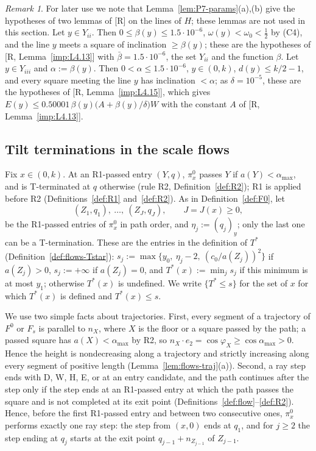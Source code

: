 \documentclass[11pt]{amsart}
\newcommand{\amax}{\alpha_{\max}}
\newcommand{\Fz}{F^{0}}
\newcommand{\Fs}{F_{s}}
\newcommand{\Tstar}{T^{*}}
\theoremstyle{definition}
\theoremstyle{remark}
\newtheorem{remark}[theorem]{Remark}
\numberwithin{equation}{section}
\begin{document}
\begin{remark}\label{rem:P7-R}
For later use we note that Lemma~\ref{lem:P7-params}(a),(b) give the hypotheses of two lemmas of [R] on the lines of $H$; these lemmas are not used in this section. Let $y\in Y_{ii}$. Then $0\le\beta(y)\le1.5\cdot10^{-6}$, $\omega(y)<\omega_0<\frac12$ by (C4), and the line $y$ meets a square of inclination $\ge\beta(y)$; these are the hypotheses of [R, Lemma~\ref{imp:L4.13}] with $\bar\beta=1.5\cdot10^{-6}$, the set $Y_{ii}$ and the function $\beta$. Let $y\in Y_{iii}$ and $\alpha:=\beta(y)$. Then $0<\alpha\le1.5\cdot10^{-6}$, $y\in(0,k)$, $d(y)\le k/2-1$, and every square meeting the line $y$ has inclination $<\alpha$; as $\delta=10^{-5}$, these are the hypotheses of [R, Lemma~\ref{imp:L4.15}], which gives $E(y)\le0.50001\,\beta(y)\big(A+\beta(y)/\delta\big)W$ with the constant $A$ of [R, Lemma~\ref{imp:L4.13}].
\end{remark}

\subsection{Tilt terminations in the scale flows}\label{ssec:P7-T}

Fix $x\in(0,k)$. At an R1-passed entry $(Y,q)$, $\pi^0_x$ passes $Y$ if $a(Y)<\amax$, and is T-terminated at $q$ otherwise (rule R2, Definition~\ref{def:R2}); R1 is applied before R2 (Definitions~\ref{def:R1} and~\ref{def:R2}). As in Definition~\ref{def:F0}, let
\[
(Z_1,q_1),\ \dots,\ (Z_J,q_J),\qquad J=J(x)\ge0,
\]
be the R1-passed entries of $\pi^0_x$ in path order, and $\eta_j:=(q_j)_y$; only the last one can be a T-termination. These are the entries in the definition of $\Tstar$ (Definition~\ref{def:flows-Tstar}): $s_j:=\max\{y_0,\ \eta_j-2,\ (c_0/a(Z_j))^2\}$ if $a(Z_j)>0$, $s_j:=+\infty$ if $a(Z_j)=0$, and $\Tstar(x):=\min_js_j$ if this minimum is at most $y_1$; otherwise $\Tstar(x)$ is undefined. We write $\{\Tstar\le s\}$ for the set of $x$ for which $\Tstar(x)$ is defined and $\Tstar(x)\le s$.

We use two simple facts about trajectories. First, every segment of a trajectory of $\Fz$ or $\Fs$ is parallel to $n_X$, where $X$ is the floor or a square passed by the path; a passed square has $a(X)<\amax$ by R2, so $n_X\cdot e_2=\cos\varphi_X\ge\cos\amax>0$. Hence the height is nondecreasing along a trajectory and strictly increasing along every segment of positive length (Lemma~\ref{lem:flows-traj}(a)). Second, a ray step ends with D, W, H, E, or at an entry candidate, and the path continues after the step only if the step ends at an R1-passed entry at which the path passes the square and is not completed at its exit point (Definitions~\ref{def:flow}--\ref{def:R2}). Hence, before the first R1-passed entry and between two consecutive ones, $\pi^0_x$ performs exactly one ray step: the step from $(x,0)$ ends at $q_1$, and for $j\ge2$ the step ending at $q_j$ starts at the exit point $q_{j-1}+n_{Z_{j-1}}$ of $Z_{j-1}$.
\end{document}
